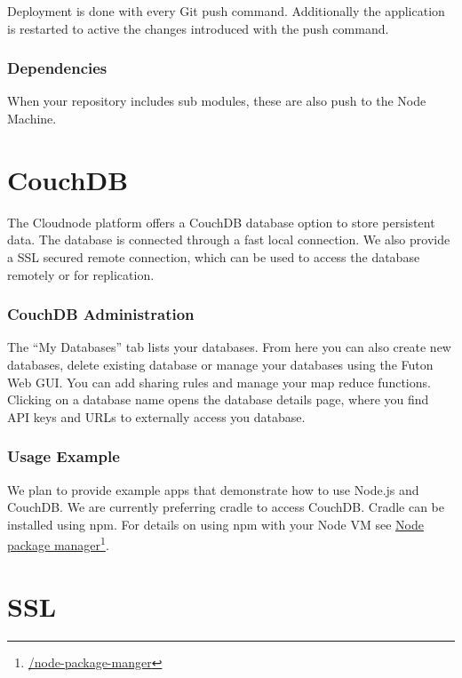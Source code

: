 Deployment is done with every Git push command. Additionally the application is restarted to active the changes introduced with the push command.



\subsection{Dependencies}
\label{dependencies}

When your repository includes sub modules, these are also push to the Node Machine.

\chapter{CouchDB}
\label{couchdb}

The Cloudnode platform offers a CouchDB database option to store persistent data. The database is connected through a fast local connection. We also provide a SSL secured remote connection, which can be used to access the database remotely or for replication.

\subsection{CouchDB Administration}
\label{couchdbadministration}

The ``My Databases'' tab lists your databases. From here you can also create new databases, delete existing database or manage your databases using the Futon Web GUI. You can add sharing rules and manage your map reduce functions. Clicking on a database name opens the database details page, where you find API keys and URLs to externally access you database. 

\subsection{Usage Example}
\label{usageexample}

We plan to provide example apps that demonstrate how to use Node.js and CouchDB. We are currently preferring cradle to access CouchDB. Cradle can be installed using npm. For details on using npm with your Node VM see \href{/node-package-manger}{Node package manager}\footnote{\href{/node-package-manger}{\slash node-package-manger}}.

\chapter{SSL}
\label{ssl}

